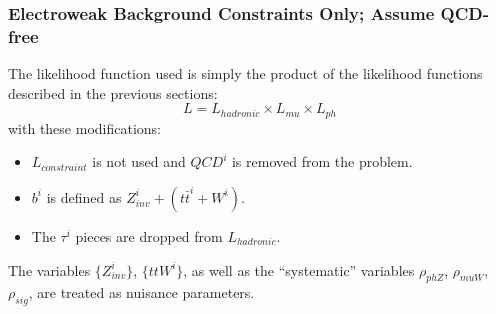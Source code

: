 \subsubsection{Electroweak Background Constraints Only; Assume QCD-free}
The likelihood function used is simply the product of the likelihood functions described in the previous sections:
\begin{equation}
L = L_{hadronic} \times L_{mu} \times L_{ph}
\end{equation}
with these modifications:
\begin{itemize}
\item $L_{constraint}$ is not used and $QCD^i$ is removed from the problem.
\item $b^i$ is defined as $Z_{inv}^{i} + (t\bar{t}^i+W^i)$.
\item The $\tau^i$ pieces are dropped from $L_{hadronic}$.
\end{itemize}
The variables $\{Z_{inv}^{i}\}$, $\{ttW^{i}\}$, as well as the ``systematic'' variables $\rho_{phZ}$, $\rho_{muW}$, $\rho_{sig}$,
are treated as nuisance parameters.

